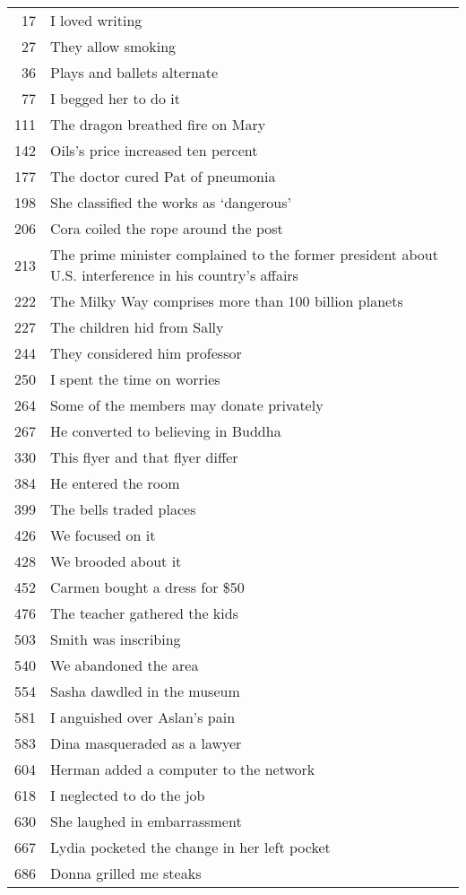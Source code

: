 \begin{longtable}{@{}rp{10cm}@{}}
17	&	I loved writing \\
27	&	They allow smoking \\
36	&	Plays and ballets alternate \\
77	&	I begged her to do it \\
111	&	The dragon breathed fire on Mary \\
142	&	Oils's price increased ten percent \\
177	&	The doctor cured Pat of pneumonia \\
198	&	She classified the works as `dangerous' \\
206	&	Cora coiled the rope around the post \\
213	&	The prime minister complained to the former president about U.S. interference in his country's affairs \\
222	&	The Milky Way comprises more than 100 billion planets \\
227	&	The children hid from Sally \\
244	&	They considered him professor \\
250	&	I spent the time on worries \\
264	&	Some of the members may donate privately \\
267	&	He converted to believing in Buddha \\
330	&	This flyer and that flyer differ \\
384	&	He entered the room \\
399	&	The bells traded places \\
426	&	We focused on it \\
428	&	We brooded about it \\
452	&	Carmen bought a dress for \$50 \\
476	&	The teacher gathered the kids \\
503	&	Smith was inscribing \\
540	&	We abandoned the area \\
554	&	Sasha dawdled in the museum \\
581	&	I anguished over Aslan's pain \\
583	&	Dina masqueraded as a lawyer \\
604	&	Herman added a computer to the network \\
618	&	I neglected to do the job \\
630	&	She laughed in embarrassment \\
667	&	Lydia pocketed the change in her left pocket \\
686	&	Donna grilled me steaks \\

\end{longtable}
